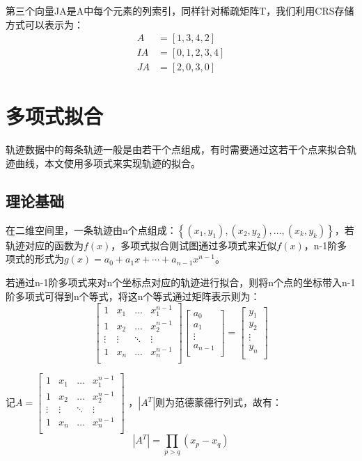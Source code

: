 第三个向量JA是A中每个元素的列索引，同样针对稀疏矩阵T，我们利用CRS存储方式可以表示为：
\[
\begin{aligned}
A&=\left[ 1,3,4,2 \right] 
\\
IA&=\left[ 0,1,2,3,4 \right] 
\\
JA&=\left[ 2,0,3,0 \right] 
\end{aligned}
\]


\section{多项式拟合}
轨迹数据中的每条轨迹一般是由若干个点组成，有时需要通过这若干个点来拟合轨迹曲线，本文使用多项式来实现轨迹的拟合。
\subsection{理论基础}
在二维空间里，一条轨迹由n个点组成：$\left\{\left(x_{1}, y_{1}\right),\left(x_{2}, y_{2}\right), \dots,\left(x_{k}, y_{k}\right)\right\}$，若轨迹对应的函数为$f(x)$，多项式拟合则试图通过多项式来近似$f(x)$，n-1阶多项式的形式为$g\left( x \right) =a_0+a_1x+\cdots +a_{n-1}x^{n-1}$。

若通过n-1阶多项式来对n个坐标点对应的轨迹进行拟合，则将n个点的坐标带入n-1阶多项式可得到n个等式，将这n个等式通过矩阵表示则为：
\begin{equation}
\label{vandermonde}
\left[ \begin{matrix}
	1&		x_1&		\dots&		x_{1}^{n-1}\\
	1&		x_2&		\dots&		x_{2}^{n-1}\\
	\vdots&		\vdots&		\ddots&		\vdots\\
	1&		x_n&		\dots&		x_{n}^{n-1}\\
\end{matrix} \right] \left[ \begin{array}{c}
	a_0\\
	a_1\\
	\vdots\\
	a_{n-1}\\
\end{array} \right] =\left[ \begin{array}{c}
	y_1\\
	y_2\\
	\vdots\\
	y_n\\
\end{array} \right] 
\end{equation}

记$A=\left[ \begin{matrix}
	1&		x_1&		\dots&		x_{1}^{n-1}\\
	1&		x_2&		\dots&		x_{2}^{n-1}\\
	\vdots&		\vdots&		\ddots&		\vdots\\
	1&		x_n&		\dots&		x_{n}^{n-1}\\
\end{matrix} \right] $
，$\left|A^{T}\right|$则为范德蒙德行列式，故有：
\begin{equation}
\left|A^{T}\right|=\prod_{p>q}\left(x_{p}-x_{q}\right)
\end{equation}

